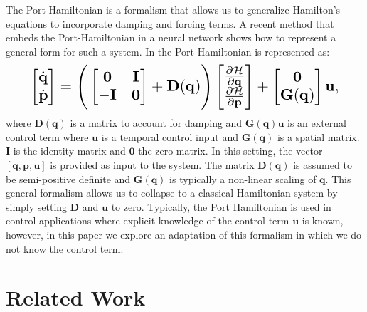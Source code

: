 \documentclass{article}
\begin{document}
The Port-Hamiltonian \cite{cherifi_overview_2020} is a formalism that allows us to generalize Hamilton's equations to incorporate damping and forcing terms. A recent method that embeds the Port-Hamiltonian in a neural network \cite{zhong_dissipative_2020} shows how to represent a general form for such a system. In \cite{zhong_dissipative_2020} the Port-Hamiltonian is represented as:
\begin{equation}
\resizebox{0.9\linewidth}{!}{$%
\begin{bmatrix}
\dot{\mathbf{q}} \\
\dot{\mathbf{p}}
\end{bmatrix}
=
\Bigg(\begin{bmatrix}
\mathbf{0} & \mathbf{I} \\
-\mathbf{I} & \mathbf{0}
\end{bmatrix} +
\mathbf{D}(\mathbf{q})
 \Bigg)
 \begin{bmatrix}
\frac{\partial \mathcal{H}}{\partial \mathbf{q}} \\
\frac{\partial \mathcal{H}}{\partial \mathbf{p}}
\end{bmatrix}
+
\begin{bmatrix}
\mathbf{0} \\
\mathbf{G}(\mathbf{q})
\end{bmatrix}
\mathbf{u},
$%
}%
\label{eqn.pham}
\end{equation}
where $\mathbf{D}(\mathbf{q})$ is a matrix to account for damping and $\mathbf{G}(\mathbf{q})\mathbf{u}$ is an external control term where $\mathbf{u}$ is a temporal control input and $\mathbf{G}(\mathbf{q})$ is a spatial matrix. $\mathbf{I}$ is the identity matrix and $\mathbf{0}$ the zero matrix. In this setting, the vector $[\mathbf{q},\mathbf{p},\mathbf{u}]$ is provided as input to the system. The matrix $\mathbf{D}(\mathbf{q})$ is assumed to be semi-positive definite and $\mathbf{G}(\mathbf{q})$ is typically a non-linear scaling of $\mathbf{q}$. This general formalism allows us to collapse to a classical Hamiltonian system by simply setting $\mathbf{D}$ and $\mathbf{u}$ to zero. Typically, the Port Hamiltonian is used in control applications where explicit knowledge of the control term $\mathbf{u}$ is known, however, in this paper we explore an adaptation of this formalism in which we do not know the control term.

\section{Related Work}
\end{document}
